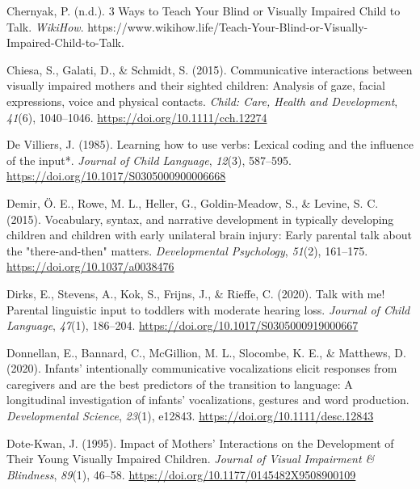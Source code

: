 \documentclass[
  man]{apa6}
\newlength{\cslhangindent}
\newlength{\cslentryspacingunit} %
\newenvironment{CSLReferences}[2] %
 {%
  \setlength{\parindent}{0pt}
  \ifodd #1
  \let\oldpar\par
  \def\par{\hangindent=\cslhangindent\oldpar}
  \fi
  \setlength{\parskip}{#2\cslentryspacingunit}
 }%
 {}
\begin{document}
\begin{CSLReferences}{1}{0}
\leavevmode{}%
Chernyak, P. (n.d.). 3 {Ways} to {Teach Your Blind} or {Visually Impaired Child} to {Talk}. \emph{WikiHow}. https://www.wikihow.life/Teach-Your-Blind-or-Visually-Impaired-Child-to-Talk.

\leavevmode{}%
Chiesa, S., Galati, D., \& Schmidt, S. (2015). Communicative interactions between visually impaired mothers and their sighted children: Analysis of gaze, facial expressions, voice and physical contacts. \emph{Child: Care, Health and Development}, \emph{41}(6), 1040--1046. \url{https://doi.org/10.1111/cch.12274}

\leavevmode{}%
De Villiers, J. (1985). Learning how to use verbs: Lexical coding and the influence of the input*. \emph{Journal of Child Language}, \emph{12}(3), 587--595. \url{https://doi.org/10.1017/S0305000900006668}

\leavevmode{}%
Demir, Ö. E., Rowe, M. L., Heller, G., Goldin-Meadow, S., \& Levine, S. C. (2015). Vocabulary, syntax, and narrative development in typically developing children and children with early unilateral brain injury: Early parental talk about the "there-and-then" matters. \emph{Developmental Psychology}, \emph{51}(2), 161--175. \url{https://doi.org/10.1037/a0038476}

\leavevmode{}%
Dirks, E., Stevens, A., Kok, S., Frijns, J., \& Rieffe, C. (2020). Talk with me! {Parental} linguistic input to toddlers with moderate hearing loss. \emph{Journal of Child Language}, \emph{47}(1), 186--204. \url{https://doi.org/10.1017/S0305000919000667}

\leavevmode{}%
Donnellan, E., Bannard, C., McGillion, M. L., Slocombe, K. E., \& Matthews, D. (2020). Infants' intentionally communicative vocalizations elicit responses from caregivers and are the best predictors of the transition to language: {A} longitudinal investigation of infants' vocalizations, gestures and word production. \emph{Developmental Science}, \emph{23}(1), e12843. \url{https://doi.org/10.1111/desc.12843}

\leavevmode{}%
Dote-Kwan, J. (1995). Impact of {Mothers}' {Interactions} on the {Development} of {Their Young Visually Impaired Children}. \emph{Journal of Visual Impairment \& Blindness}, \emph{89}(1), 46--58. \url{https://doi.org/10.1177/0145482X9508900109}


\end{CSLReferences}
\end{document}
